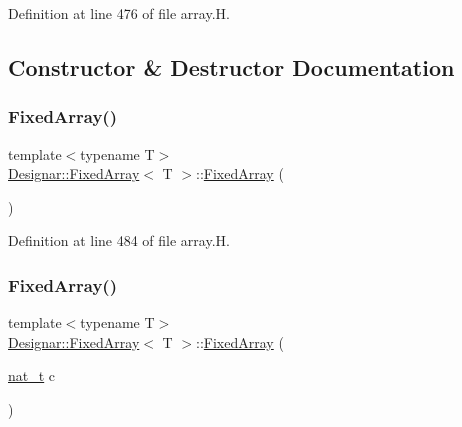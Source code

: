 Definition at line 476 of file array.\+H.



\subsection{Constructor \& Destructor Documentation}
\mbox{\label{class_designar_1_1_fixed_array_a493a48e7c23b6b882a96c5451d10248a}} 
\subsubsection{\texorpdfstring{Fixed\+Array()}{FixedArray()}\hspace{0.1cm}{\footnotesize\ttfamily [1/6]}}
{\footnotesize\ttfamily template$<$typename T$>$ \\
\hyperlink{class_designar_1_1_fixed_array}{Designar\+::\+Fixed\+Array}$<$ T $>$\+::\hyperlink{class_designar_1_1_fixed_array}{Fixed\+Array} (\begin{DoxyParamCaption}{ }\end{DoxyParamCaption})\hspace{0.3cm}{\ttfamily [inline]}}



Definition at line 484 of file array.\+H.

\mbox{\label{class_designar_1_1_fixed_array_ac3bed73485d717ddc1fc412d3e7fea58}} 
\subsubsection{\texorpdfstring{Fixed\+Array()}{FixedArray()}\hspace{0.1cm}{\footnotesize\ttfamily [2/6]}}
{\footnotesize\ttfamily template$<$typename T$>$ \\
\hyperlink{class_designar_1_1_fixed_array}{Designar\+::\+Fixed\+Array}$<$ T $>$\+::\hyperlink{class_designar_1_1_fixed_array}{Fixed\+Array} (\begin{DoxyParamCaption}\item[{\hyperlink{namespace_designar_aa72662848b9f4815e7bf31a7cf3e33d1}{nat\+\_\+t}}]{c }\end{DoxyParamCaption})\hspace{0.3cm}{\ttfamily [inline]}}



